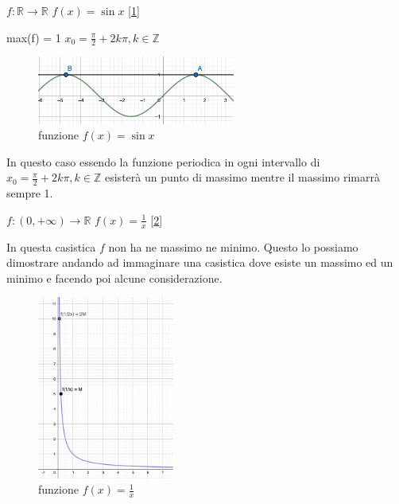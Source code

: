 \begin{example}
    $f: \mathbb{R} \longrightarrow \mathbb{R}$ \hspace{.3cm} $f(x) = \sin{x}$ [\ref{fig:massimo_sinx}]
\end{example}
max(f) = 1 \hspace{.3cm} $x_0 = \frac{\pi}{2} + 2k\pi, k \in \mathbb{Z}$\\
\begin{figure}
    \vspace{-45pt}
    \centering
    \includegraphics[width=6.5cm]{images/massimo_es1.png}
    \caption{funzione $f(x) = \sin{x}$}
    \label{fig:massimo_sinx}
\end{figure}
In questo caso essendo la funzione periodica in ogni intervallo di $x_0 = \frac{\pi}{2} + 2k\pi, k \in \mathbb{Z}$ esisterà un punto di massimo mentre il massimo rimarrà sempre 1.
\begin{example}
    $f:(0, +\infty) \longrightarrow \mathbb{R}$ \hspace{.3cm} $f(x) = \frac{1}{x}$ [\ref{fig:massimo-minimo-frazione}]
\end{example}
In questa casistica $f$ non ha ne massimo ne minimo. Questo lo possiamo dimostrare andando ad immaginare una casistica dove esiste un massimo ed un minimo e facendo poi alcune considerazione. \\
\begin{figure}
    \vspace{-15pt}
    \centering
    \includegraphics[width=4.5cm]{images/massimo_es2.png}
    \caption{funzione $f(x) = \frac{1}{x}$}
    \label{fig:massimo-minimo-frazione}
\end{figure}
